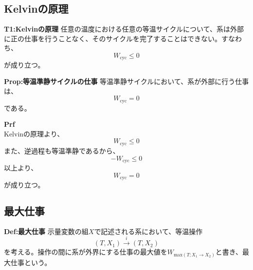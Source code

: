 \documentclass[a4paper,11pt]{jsarticle}
\numberwithin{equation}{section}
\begin{document}
\subsection{Kelvinの原理}
\begin{itembox}[l]{\textbf{T1:Kelvinの原理}}
    任意の温度における任意の等温サイクルについて、系は外部に正の仕事を行うことなく、そのサイクルを完了することはできない。すなわち、
    \begin{equation}
        W_{\text{cyc}} \leq 0
    \end{equation}
    が成り立つ。
\end{itembox}

\begin{itembox}[l]{\textbf{Prop:等温準静サイクルの仕事}}
    等温準静サイクルにおいて、系が外部に行う仕事は、
    \begin{equation}
        W_{\text{cyc}} = 0
    \end{equation}
    である。
\end{itembox}
\textbf{Prf}\\
Kelvinの原理より、
\begin{equation}
    W_{\text{cyc}} \leq 0
\end{equation}
また、逆過程も等温準静であるから、
\begin{equation}
    -W_{\text{cyc}} \leq 0
\end{equation}
以上より、
\begin{equation}
    W_{\text{cyc}} = 0
\end{equation}
が成り立つ。\\

\subsection{最大仕事}
\begin{itembox}[l]{\textbf{Def:最大仕事}}
    示量変数の組$X$で記述される系において、等温操作
    \begin{equation}
        (T,X_1) \xrightarrow{i} (T,X_2)
    \end{equation}
    を考える。操作の間に系が外界にする仕事の最大値を$W_{\text{max}(T;X_1\rightarrow X_2)}$と書き、最大仕事という。
\end{itembox}
\end{document}
